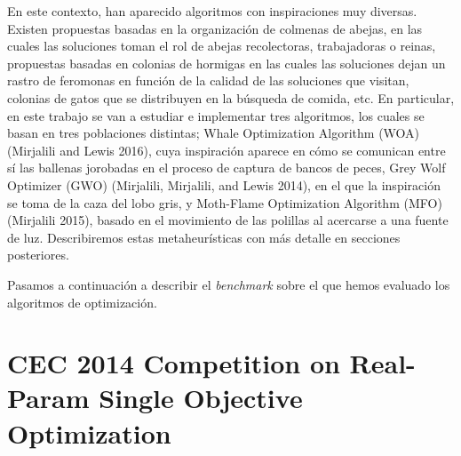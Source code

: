 \documentclass[
  a4paper,
,tablecaptionabove
]{scrartcl}
\begin{document}
En este contexto, han aparecido algoritmos con inspiraciones muy
diversas. Existen propuestas basadas en la organización de colmenas de
abejas, en las cuales las soluciones toman el rol de abejas
recolectoras, trabajadoras o reinas, propuestas basadas en colonias de
hormigas en las cuales las soluciones dejan un rastro de feromonas en
función de la calidad de las soluciones que visitan, colonias de gatos
que se distribuyen en la búsqueda de comida, etc. En particular, en este
trabajo se van a estudiar e implementar tres algoritmos, los cuales se
basan en tres poblaciones distintas; Whale Optimization Algorithm (WOA)
(Mirjalili and Lewis 2016), cuya inspiración aparece en cómo se
comunican entre sí las ballenas jorobadas en el proceso de captura de
bancos de peces, Grey Wolf Optimizer (GWO) (Mirjalili, Mirjalili, and
Lewis 2014), en el que la inspiración se toma de la caza del lobo gris,
y Moth-Flame Optimization Algorithm (MFO) (Mirjalili 2015), basado en el
movimiento de las polillas al acercarse a una fuente de luz.
Describiremos estas metaheurísticas con más detalle en secciones
posteriores.

Pasamos a continuación a describir el \emph{benchmark} sobre el que
hemos evaluado los algoritmos de optimización.

\hypertarget{cec-2014-competition-on-real-param-single-objective-optimization}{%
\section{CEC 2014 Competition on Real-Param Single Objective
Optimization}\label{cec-2014-competition-on-real-param-single-objective-optimization}}
\end{document}
